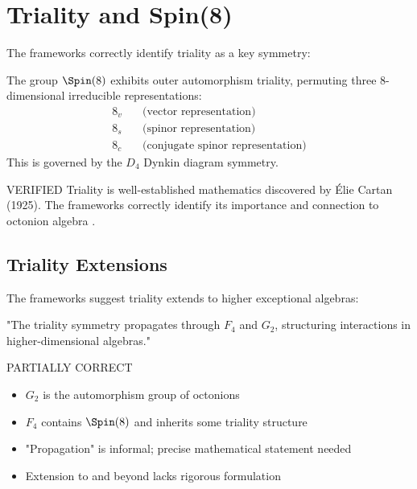 \section{Triality and Spin(8)}

The frameworks correctly identify triality as a key symmetry:

\begin{theorem}
The group $\Spin(8)$ exhibits outer automorphism triality, permuting three 8-dimensional irreducible representations:
\begin{align}
    8_v &\quad \text{(vector representation)} \\
    8_s &\quad \text{(spinor representation)} \\
    8_c &\quad \text{(conjugate spinor representation)}
\end{align}
This is governed by the $D_4$ Dynkin diagram symmetry.
\end{theorem}

\begin{factcheck}{VERIFIED}
Triality is well-established mathematics discovered by Élie Cartan (1925). The frameworks correctly identify its importance and connection to octonion algebra \cite{baez2001octonions}.
\end{factcheck}

\subsection{Triality Extensions}

The frameworks suggest triality extends to higher exceptional algebras:

\begin{claim}
"The triality symmetry propagates through $F_4$ and $G_2$, structuring interactions in higher-dimensional algebras."
\end{claim}

\begin{factcheck}{PARTIALLY CORRECT}
\begin{itemize}
    \item[$+$] $G_2$ is the automorphism group of octonions
    \item[$+$] $F_4$ contains $\Spin(8)$ and inherits some triality structure
    \item[$\sim$] "Propagation" is informal; precise mathematical statement needed
    \item[$-$] Extension to  and beyond lacks rigorous formulation
\end{itemize}
\end{factcheck}

